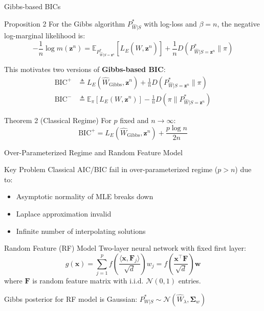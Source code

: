 \documentclass{beamer}
\begin{document}
\begin{frame}{Gibbs-based BICs}

\begin{block}{Proposition 2}
For the Gibbs algorithm $P^*_{\hat{W}|S}$ with log-loss and $\beta = n$, the negative log-marginal likelihood is:
\[
-\frac{1}{n} \log m(\bm{z}^n) = \mathbb{E}_{P^*_{\hat{W}|S=\bm{z}^n}}[L_E(\hat{W}, \bm{z}^n)] + \frac{1}{n} D(P^*_{\hat{W}|S=\bm{z}^n} \| \pi)
\]
\end{block}

This motivates two versions of \textbf{Gibbs-based BIC}:
\begin{align*}
\text{BIC}^{+} &\triangleq L_E(\hat{W}_{\text{Gibbs}}, \bm{z}^n) + \frac{1}{n} D(P^*_{\hat{W}|S=\bm{z}^n} \| \pi) \\
\text{BIC}^{-} &\triangleq \mathbb{E}_{\pi}[L_E(W, \bm{z}^n)] - \frac{1}{n} D(\pi \| P^*_{\hat{W}|S=\bm{z}^n})
\end{align*}

\begin{block}{Theorem 2 (Classical Regime)}
For $p$ fixed and $n \to \infty$:
\[
\text{BIC}^{+} = L_E(\hat{W}_{\text{Gibbs}}, \bm{z}^n) + \frac{p \log n}{2n}
\]
\end{block}

\end{frame}

\begin{frame}{Over-Parameterized Regime and Random Feature Model}

\begin{block}{Key Problem}
Classical AIC/BIC fail in over-parameterized regime ($p > n$) due to:
\begin{itemize}
    \item Asymptotic normality of MLE breaks down
    \item Laplace approximation invalid
    \item Infinite number of interpolating solutions
\end{itemize}
\end{block}

\begin{block}{Random Feature (RF) Model}
Two-layer neural network with fixed first layer:
\[
g(\bm{x}) = \sum_{j=1}^{p} f\left(\frac{\langle \bm{x}, \bm{F}_j \rangle}{\sqrt{d}}\right) w_j = f\left(\frac{\bm{x}^\top \bm{F}}{\sqrt{d}}\right) \bm{w}
\]
where $\bm{F}$ is random feature matrix with i.i.d. $\mathcal{N}(0,1)$ entries.
\end{block}

Gibbs posterior for RF model is Gaussian: $P^*_{W|S} \sim \mathcal{N}(\hat{W}_\lambda, \bm{\Sigma}_w)$

\end{frame}
\end{document}
